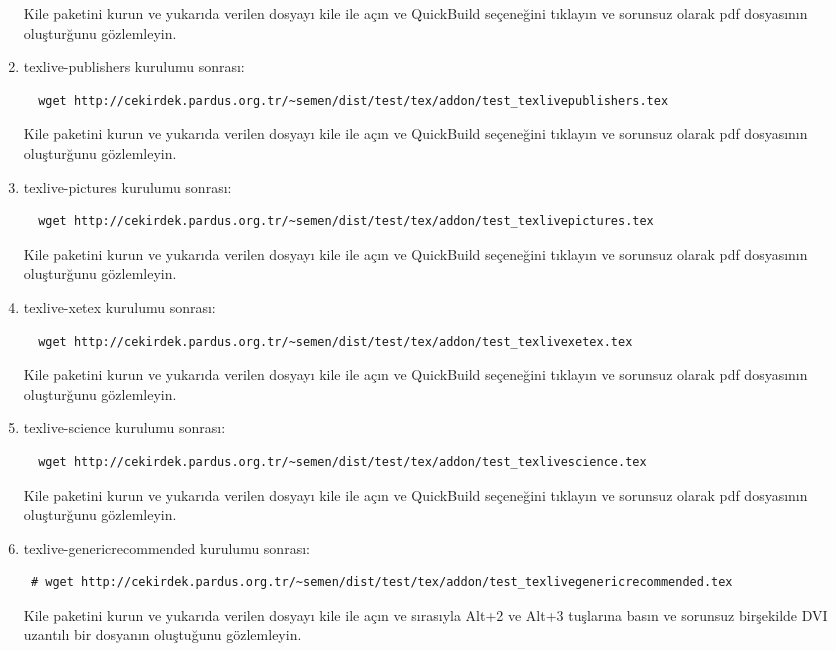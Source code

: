 \documentclass[a4paper,10pt]{article}
\begin{document}
\begin{enumerate}
Kile paketini kurun ve yukarıda verilen dosyayı kile ile açın ve QuickBuild  seçeneğini tıklayın ve sorunsuz olarak pdf dosyasının oluşturğunu gözlemleyin.
\item texlive-publishers kurulumu sonrası:
\begin{verbatim}
  wget http://cekirdek.pardus.org.tr/~semen/dist/test/tex/addon/test_texlivepublishers.tex
\end{verbatim}

Kile paketini kurun ve yukarıda verilen dosyayı kile ile açın ve QuickBuild  seçeneğini tıklayın ve sorunsuz olarak pdf dosyasının oluşturğunu gözlemleyin.

\item texlive-pictures kurulumu sonrası:
\begin{verbatim}
  wget http://cekirdek.pardus.org.tr/~semen/dist/test/tex/addon/test_texlivepictures.tex
\end{verbatim}

Kile paketini kurun ve yukarıda verilen dosyayı kile ile açın ve QuickBuild  seçeneğini tıklayın ve sorunsuz olarak pdf dosyasının oluşturğunu gözlemleyin.

\item texlive-xetex kurulumu sonrası:
\begin{verbatim}
  wget http://cekirdek.pardus.org.tr/~semen/dist/test/tex/addon/test_texlivexetex.tex
\end{verbatim}

Kile paketini kurun ve yukarıda verilen dosyayı kile ile açın ve QuickBuild  seçeneğini tıklayın ve sorunsuz olarak pdf dosyasının oluşturğunu gözlemleyin.
\item texlive-science kurulumu sonrası:
\begin{verbatim}
  wget http://cekirdek.pardus.org.tr/~semen/dist/test/tex/addon/test_texlivescience.tex
\end{verbatim}

Kile paketini kurun ve yukarıda verilen dosyayı kile ile açın ve QuickBuild  seçeneğini tıklayın ve sorunsuz olarak pdf dosyasının oluşturğunu gözlemleyin.

\item texlive-genericrecommended kurulumu sonrası:
\begin{verbatim}
 # wget http://cekirdek.pardus.org.tr/~semen/dist/test/tex/addon/test_texlivegenericrecommended.tex
\end{verbatim}

Kile paketini kurun ve yukarıda verilen dosyayı kile ile açın ve sırasıyla Alt+2 ve Alt+3 tuşlarına basın ve sorunsuz birşekilde DVI uzantılı bir dosyanın oluştuğunu gözlemleyin.


\end{enumerate}
\end{document}
